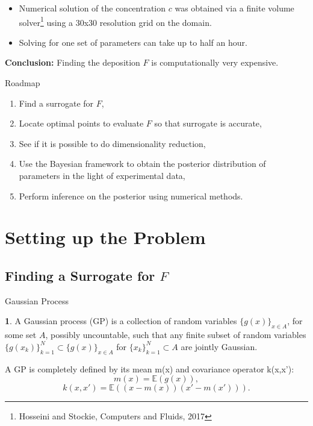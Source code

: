 \documentclass[11pt]{beamer}
\theoremstyle{plain}
\theoremstyle{definition}
\newtheorem{dfn}{}[section]
\begin{document}
\begin{frame}
\begin{itemize}

\item Numerical solution of the concentration $c$ was obtained via 
a finite volume solver\footnote{Hosseini and Stockie, Computers and Fluids, 2017}
using a 30x30 resolution grid on the domain.



\item Solving for one set of parameters can take up to half an hour.
\end{itemize}

\textbf{Conclusion:} Finding the deposition $F$  is computationally very expensive.
\end{frame}






\begin{frame}{Roadmap}
\begin{enumerate}
\item Find a surrogate for $F$,
\item Locate  optimal points to evaluate $F$ so that surrogate is accurate,
\item See if it is possible to do dimensionality reduction,
\item Use the Bayesian framework to obtain the posterior distribution of  parameters 
in the light of  experimental data,
\item Perform inference on the posterior using numerical methods.
\end{enumerate}
\end{frame}  


\section{Setting up the Problem}

\subsection{Finding a Surrogate for $F$}


\begin{frame}{Gaussian Process}
\begin{dfn} 
A Gaussian process (GP) is a collection of random variables $\{g(x)\}_{x\in A}$, for some set $A$,
possibly uncountable,
 such that any finite subset of random variables
 $\{g(x_{k})\}_{k=1}^{N}\subset\{g(x)\}_{x\in A}$ for
$\{x_{k}\}_{k=1}^{N}\subset A$ are jointly Gaussian.

A GP is completely defined by its mean m(x) and covariance operator k(x,x'):
\begin{equation*}
m(x)=\mathbb{E}(g(x)),
\end{equation*}
\begin{equation*}
k(x,x')=\mathbb{E}\left((x-m(x))(x'-m(x'))\right).
\end{equation*}

\end{dfn}
\end{frame}
\end{document}
